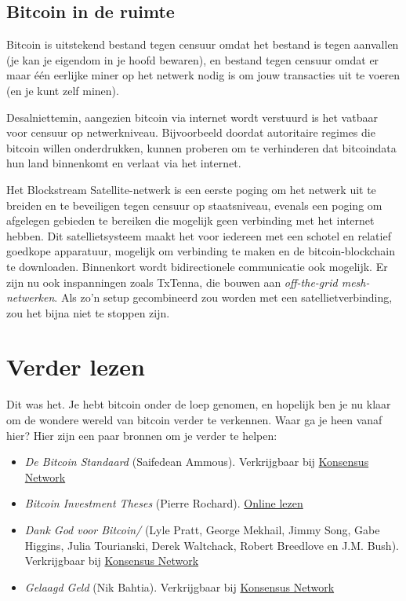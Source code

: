 \documentclass[
  letterpaper,
]{scrbook}
\begin{document}
\hypertarget{bitcoin-in-de-ruimte}{%
\section{Bitcoin in de ruimte}\label{bitcoin-in-de-ruimte}}

Bitcoin is uitstekend bestand tegen censuur omdat het bestand is tegen
aanvallen (je kan je eigendom in je hoofd bewaren), en bestand tegen
censuur omdat er maar één eerlijke miner op het netwerk nodig is om jouw
transacties uit te voeren (en je kunt zelf minen).

Desalniettemin, aangezien bitcoin via internet wordt verstuurd is het
vatbaar voor censuur op netwerkniveau. Bijvoorbeeld doordat autoritaire
regimes die bitcoin willen onderdrukken, kunnen proberen om te
verhinderen dat bitcoindata hun land binnenkomt en verlaat via het
internet.

Het Blockstream Satellite-netwerk is een eerste poging om het netwerk
uit te breiden en te beveiligen tegen censuur op staatsniveau, evenals
een poging om afgelegen gebieden te bereiken die mogelijk geen
verbinding met het internet hebben. Dit satellietsysteem maakt het voor
iedereen met een schotel en relatief goedkope apparatuur, mogelijk om
verbinding te maken en de bitcoin-blockchain te downloaden. Binnenkort
wordt bidirectionele communicatie ook mogelijk. Er zijn nu ook
inspanningen zoals TxTenna, die bouwen aan \emph{off-the-grid
mesh-netwerken}. Als zo'n setup gecombineerd zou worden met een
satellietverbinding, zou het bijna niet te stoppen zijn.

\hypertarget{verder-lezen}{%
\chapter*{Verder lezen}\label{verder-lezen}}


Dit was het. Je hebt bitcoin onder de loep genomen, en hopelijk ben je
nu klaar om de wondere wereld van bitcoin verder te verkennen. Waar ga
je heen vanaf hier? Hier zijn een paar bronnen om je verder te helpen:

\begin{itemize}
\item
  \emph{De Bitcoin Standaard} (Saifedean Ammous). Verkrijgbaar bij
  \href{https://konsensus.network/product/de-bitcoin-standaard}{Konsensus
  Network}
\item
  \emph{Bitcoin Investment Theses} (Pierre Rochard).
  \href{https://pierre-rochard.medium.com/bitcoin-investment-theses-part-1-e97670b5389b}{Online
  lezen}
\item
  \emph{Dank God voor Bitcoin/} (Lyle Pratt, George Mekhail, Jimmy Song,
  Gabe Higgins, Julia Tourianski, Derek Waltchack, Robert Breedlove en
  J.M. Bush). Verkrijgbaar bij
  \href{https://konsensus.network/product/dank-god-voor-bitcoin/}{Konsensus
  Network}
\item
  \emph{Gelaagd Geld} (Nik Bahtia). Verkrijgbaar bij
  \href{https://konsensus.network/product/gelaagd-geld/}{Konsensus
  Network}
\end{itemize}
\end{document}
